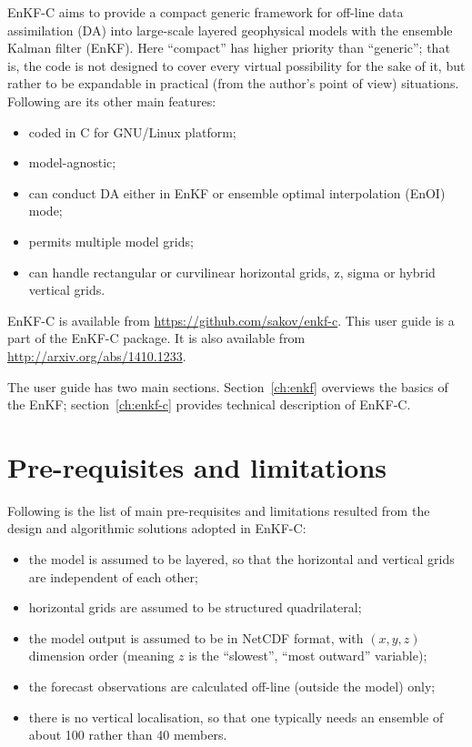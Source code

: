 \documentclass[11pt]{report}
\begin{document}
EnKF-C aims to provide a compact generic framework for off-line data assimilation (DA) into large-scale layered geophysical models with the ensemble Kalman filter (EnKF).
Here ``compact'' has higher priority than ``generic''; that is, the code is not designed to cover every virtual possibility for the sake of it, but rather to be expandable in practical (from the author's point of view) situations.
Following are its other main features:
\begin{itemize}
\item coded in C for GNU/Linux platform;
\item model-agnostic;
\item can conduct DA either in EnKF or ensemble optimal interpolation (EnOI) mode;
\item permits multiple model grids;
\item can handle rectangular or curvilinear horizontal grids, z, sigma or hybrid vertical grids.
\end{itemize}

EnKF-C is available from \url{https://github.com/sakov/enkf-c}.
This user guide is a part of the EnKF-C package. 
It is also available from \url{http://arxiv.org/abs/1410.1233}.

The user guide has two main sections.
Section~\ref{ch:enkf} overviews the basics of the EnKF; section~\ref{ch:enkf-c} provides technical description of EnKF-C.

\section*{Pre-requisites and limitations}

Following is the list of main pre-requisites and limitations resulted from the design and algorithmic solutions adopted in EnKF-C:
\begin{itemize}
\item the model is assumed to be layered, so that the horizontal and vertical grids are independent of each other;
\item horizontal grids are assumed to be structured quadrilateral;
\item the model output is assumed to be in NetCDF format, with $(x, y, z)$ dimension order (meaning $z$ is the ``slowest'', ``most outward'' variable);
\item the forecast observations are calculated off-line (outside the model) only;
\item there is no vertical localisation, so that one typically needs an ensemble of about 100 rather than 40 members.
\end{itemize}
\end{document}
